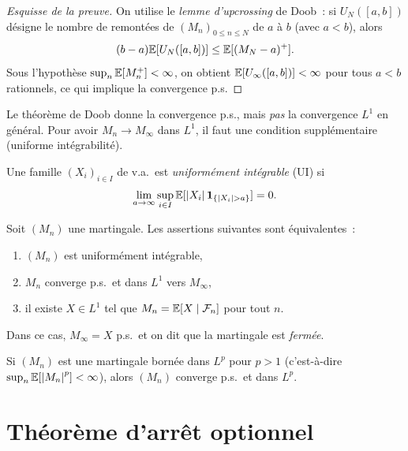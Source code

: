 \begin{proof}[Esquisse de la preuve]
On utilise le \emph{lemme d'upcrossing} de Doob~: si $U_N([a,b])$ d\'esigne le
nombre de remont\'ees de $(M_n)_{0 \leq n \leq N}$ de $a$ \`a $b$ (avec $a < b$), alors
\[
  (b - a) \mathbb{E}[U_N([a,b])] \leq \mathbb{E}[(M_N - a)^+].
\]
Sous l'hypoth\`ese $\sup_n \mathbb{E}[M_n^+] < \infty$, on obtient
$\mathbb{E}[U_{\infty}([a,b])] < \infty$ pour tous $a < b$ rationnels, ce qui implique
la convergence p.s.
\end{proof}

\begin{attention}[title=\textbf{Convergence p.s.\ vs.\ $L^1$}]
Le th\'eor\`eme de Doob donne la convergence p.s., mais \emph{pas} la convergence
$L^1$ en g\'en\'eral. Pour avoir $M_n \to M_{\infty}$ dans $L^1$, il faut une
condition suppl\'ementaire (uniforme int\'egrabilit\'e).
\end{attention}

\begin{definition}
Une famille $(X_i)_{i \in I}$ de v.a.\ est \emph{uniform\'ement int\'egrable} (UI) si
\[
  \lim_{a \to \infty} \sup_{i \in I} \mathbb{E}[\left| X_i \right| \mathbf{1}_{\{\left| X_i \right| > a\}}] = 0.
\]
\end{definition}

\begin{theoreme}[Convergence $L^1$]
\label{thm:L1_convergence}
Soit $(M_n)$ une martingale. Les assertions suivantes sont \'equivalentes~:
\begin{enumerate}
  \item $(M_n)$ est uniform\'ement int\'egrable,
  \item $M_n$ converge p.s.\ et dans $L^1$ vers $M_{\infty}$,
  \item il existe $X \in L^1$ tel que $M_n = \mathbb{E}[X \mid \mathcal{F}_n]$ pour tout $n$.
\end{enumerate}
Dans ce cas, $M_{\infty} = X$ p.s.\ et on dit que la martingale est \emph{ferm\'ee}.
\end{theoreme}

\begin{corollaire}
Si $(M_n)$ est une martingale born\'ee dans $L^p$ pour $p > 1$
(c'est-\`a-dire $\sup_n \mathbb{E}[\left| M_n \right|^p] < \infty$), alors $(M_n)$ converge p.s.\ et
dans $L^p$.
\end{corollaire}

\section{Th\'eor\`eme d'arr\^et optionnel}

